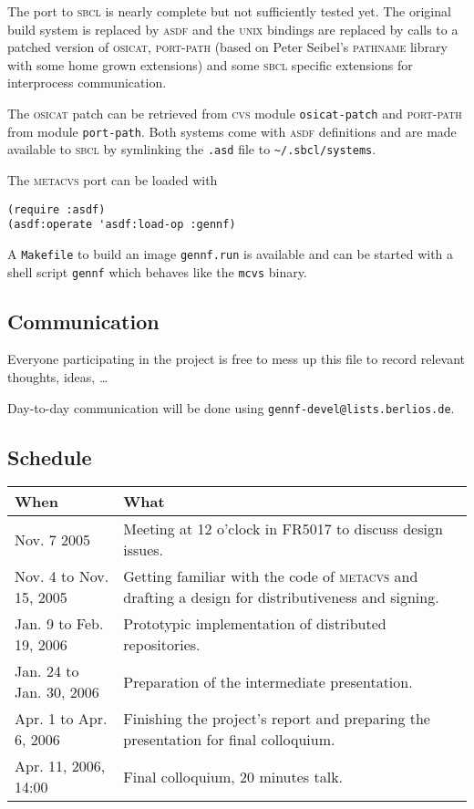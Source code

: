 \documentclass[fleqn, 10pt, a4paper]{report}
\begin{document}
The port to \textsc{sbcl} is nearly complete but not sufficiently
tested yet. The original build system is replaced by \textsc{asdf}
and the \textsc{unix} bindings are replaced by calls to a patched version of
\textsc{osicat}, \textsc{port-path} (based on Peter Seibel's
\textsc{pathname} library with some home grown extensions) and some
\textsc{sbcl} specific extensions for interprocess communication.

The \textsc{osicat} patch can be retrieved from \textsc{cvs}
module \texttt{osicat-patch} and \textsc{port-path} from
module \texttt{port-path}. Both systems come with \textsc{asdf}
definitions and are made available to \textsc{sbcl} by symlinking
the \texttt{.asd} file to \texttt{\textasciitilde{}/.sbcl/systems}.

The \textsc{metacvs} port can be loaded with

\begin{verbatim}
(require :asdf)
(asdf:operate 'asdf:load-op :gennf)
\end{verbatim}

A \texttt{Makefile} to build an image \texttt{gennf.run}
is available and can be started with a shell script \texttt{gennf}
which behaves like the \texttt{mcvs} binary.


\subsection{Communication}

Everyone participating in the project is free to mess up this file to
record relevant thoughts, ideas, \ldots

Day-to-day communication will be done using
\texttt{gennf-devel@lists.berlios.de}.


\subsection{Schedule \label{schedule}}

\begin{tabular}{|p{}|p{}|}
  \hline
  \textmd{When} & \textmd{What} \\
  \hline\hline
  Nov. 7 2005 &
  Meeting at 12 o'clock in FR5017 to discuss design issues. \\
  \hline
  Nov. 4 to Nov. 15, 2005 &
  Getting familiar with the code of \textsc{metacvs}
  and drafting a design for distributiveness and signing. \\
  \hline
  Jan. 9 to Feb. 19, 2006 & Prototypic implementation of
  distributed repositories. \\
  \hline
  Jan. 24 to Jan. 30, 2006 & Preparation of the intermediate
  presentation. \\
  \hline
  Apr. 1 to Apr. 6, 2006 & Finishing the project's report
  and preparing the presentation for final colloquium. \\
  \hline
  Apr. 11, 2006, 14:00 & Final colloquium, 20 minutes talk. \\
  \hline
\end{tabular}
\end{document}
